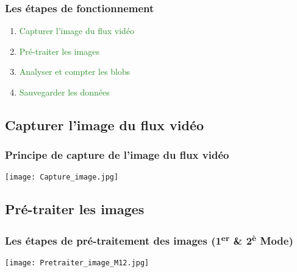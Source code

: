 \documentclass{beamer}
\begin{document}
\begin{frame}
\frametitle{Les étapes de fonctionnement}
\begin{enumerate}
\item \textcolor{forestgreen}{\Large{Capturer l'image du flux vidéo}}
\bigskip
\item \textcolor{forestgreen}{\Large{Pré-traiter les images}}
\bigskip
\item \textcolor{forestgreen}{\Large{Analyser et compter les blobs}}
\bigskip
\item \textcolor{forestgreen}{\Large{Sauvegarder les données}}
\end{enumerate}
\end{frame}

\subsection{Capturer l'image du flux vidéo} %

\begin{frame}
\frametitle{Principe de capture de l'image du flux vidéo}
\centering
    \texttt{[image: Capture\_image.jpg]}
\end{frame}

\subsection{Pré-traiter les images} %

\begin{frame}
\frametitle{Les étapes de pré-traitement des images (1\textsuperscript{er} \& 2\textsuperscript{è} Mode)}
\centering
    \texttt{[image: Pretraiter\_image\_M12.jpg]}
\end{frame}
\end{document}

